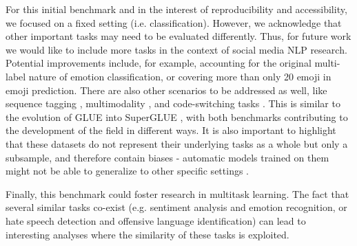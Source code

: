 \documentclass[11pt,a4paper]{article}
\begin{document}
For this initial benchmark and in the interest of reproducibility and accessibility, we focused on a fixed setting (i.e. classification). However, we acknowledge that other important tasks may need to be evaluated differently. Thus,
for future work we would like to include more tasks in the context of social media NLP research. Potential improvements include, for example, accounting for the original multi-label nature of emotion classification, or covering more than only 20 emoji in emoji prediction. There are also other scenarios to be addressed as well, like sequence tagging \citep{baldwin2015shared, postwitter}, multimodality \citep{2016arXiv160802289S,lu2018visual}, and code-switching tasks \citep{barman2014code,vilares2016cs}. This is similar to the evolution of GLUE \cite{wang2019glue} into SuperGLUE \cite{wang2019superglue}, with both benchmarks contributing to the development of the field in different ways. It is also important to highlight that these datasets do not represent their underlying tasks as a whole but only a subsample,  and therefore contain biases - automatic models trained on them might not be able to generalize to other specific settings \cite{augenstein2017generalisation,wiegand-etal-2019-detection}.

Finally, this benchmark could foster research in multitask learning. The fact that several similar tasks co-exist (e.g. sentiment analysis and emotion recognition, or hate speech detection and offensive language identification) can lead to interesting analyses where the similarity of these tasks is exploited. 















\end{document}
